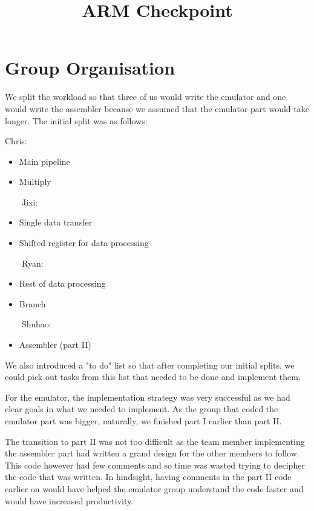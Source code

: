 \documentclass{article}
\newenvironment{itemizeminus}{\begin{itemize} \renewcommand{\labelitemi}{$-$}\renewcommand{\labelitemii}{$-$}\renewcommand{\labelitemiii}{$-$}\renewcommand{\labelitemiv}{$-$}}{\end{itemize}}
\begin{document}
\title{ARM Checkpoint }
\author{}
\maketitle

\section{Group Organisation}

We split the workload so that three of us would write the emulator and one
would write the assembler because we assumed that the emulator part would take
longer. The initial split was as follows:

Chris:
\begin{itemizeminus}
  \item Main pipeline
  
  \item Multiply
\end{itemizeminus}
\ \ \ \ Jixi:
\begin{itemizeminus}
  \item Single data transfer
  
  \item Shifted register for data processing
\end{itemizeminus}
\ \ \ \ Ryan:
\begin{itemizeminus}
  \item Rest of data processing
  
  \item Branch
\end{itemizeminus}
\ \ \ \ Shuhao:
\begin{itemizeminus}
  \item Assembler (part II)
\end{itemizeminus}
We also introduced a "to do" list so that after completing our initial splits,
we could pick out tasks from this list that needed to be done and implement
them.

For the emulator, the implementation strategy was very successful as we had
clear goals in what we needed to implement. As the group that coded the
emulator part was bigger, naturally, we finished part I earlier than part II.

The transition to part II was not too difficult as the team member
implementing the assembler part had written a grand design for the other
members to follow. This code however had few comments and so time was wasted
trying to decipher the code that was written. In hindsight, having comments in
the part II code earlier on would have helped the emulator group understand
the code faster and would have increased productivity.
\end{document}
